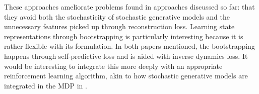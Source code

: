 These approaches ameliorate problems found in approaches discussed so far: that they avoid both the stochasticity 
of stochastic generative models and the unnecessary features picked up through reconstruction loss.
Learning state representations through bootstrapping is particularly interesting because it is rather
flexible with its formulation. In both papers mentioned, the bootstrapping happens
through self-predictive loss and is aided with inverse dynamics loss.
It would be interesting to integrate this more deeply with an appropriate reinforcement learning algorithm,
akin to how stochastic generative models are integrated in the MDP in \cite{slac}.


